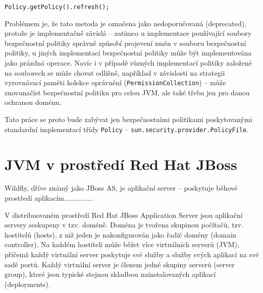 \begin{verbatim}
Policy.getPolicy().refresh();
\end{verbatim}

Problémem je, že tato metoda je označena jako nedoporučovaná (deprecated), protože je implementačně závislá -- zatímco u implementace používající soubory bezpečnostní politiky správně způsobí projevení změn v souboru bezpečnostní politiky, u jiných implementací bezpečnostní politiky může být implementována jako prázdná operace. Navíc i v případě různých implementací politiky založené na souborech se může chovat odlišně, například v závislosti na strategii vyrovnávací paměti kolekce oprávnění ({\tt PermissionCollection}) -- může znovunačíst bezpečnostní politiku pro celou JVM, ale také třeba jen pro danou ochranou doménu. \cite{refPolicy}

Tato práce se proto bude zabývat jen bezpečnostními politikami poskytovanými standardní implementací třídy {\tt Policy} -- {\tt sun.security.provider.PolicyFile}.

\chapter{JVM v prostředí Red Hat JBoss}

Wildfly, dříve známý jako JBoss AS, je aplikační server -- poskytuje běhové prostředí aplikacím............... \cite{theServerSideAppServer}

V distribuovaném prostředí Red Hat JBoss Application Server jsou aplikační servery seskupeny v tzv. doméně.
Doména je tvořena skupinou počítačů, tzv. hostitelů (hosts), z niž jeden je nakonfigurován jako řadič domény (domain controller).
Na každém hostiteli může běžet více virtuálních serverů (JVM), přičemž každý virtuální server poskytuje své služby a služby svých aplikací na své sadě portů.
Každý virtuální server je členem jedné skupiny serverů (server group), které jsou typické stejnou skladbou nainstalovaných aplikací (deployments).





















